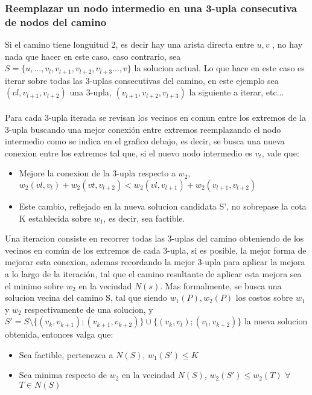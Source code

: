 \subsubsection{Reemplazar un nodo intermedio en una 3-upla consecutiva de nodos del camino}
Si el camino tiene longuitud 2, es decir hay una arista directa entre $u,v$ , no hay nada que hacer en este caso, caso contrario, sea $S = \{u,...,v_l, v_{l+1}, v_{l+2}, v_{l+3} ..., v\}$ la solucion actual. Lo que hace en este caso es iterar sobre todas las 3-uplas consecutivas del camino, en este ejemplo sea $(vl, v_{l+1}, v_{l+2})$ una 3-upla, $(v_{l+1}, v_{l+2}, v_{l+3})$ la siguiente a iterar, etc...\\ \\
Para cada 3-upla iterada se revisan los vecinos en comun entre los extremos de la 3-upla buscando una mejor conexi\'on entre extremos reemplazando el nodo intermedio 
como se indica en el grafico debajo, es decir, se busca una nueva conexion entre los extremos tal que, si el nuevo nodo intermedio es $v_t$, vale que:
\begin{itemize}
	\item Mejore la conexion de la 3-upla respecto a $w_2$, $w_2(vl, v_{t}) + w_2(vt, v_{l+2}) < w_2(vl, v_{l+1}) + w_2(v_{l+1}, v_{l+2})$
	\item Este cambio, reflejado en la nueva solucion candidata S', no sobrepase la cota K establecida sobre $w_1$, es decir, sea factible.
\end{itemize}


Una iteracion consiste en recorrer todas las 3-uplas del camino obteniendo de los vecinos en com\'un de los extremos de cada 3-upla, si es posible, la mejor forma de mejorar esta conexion, ademas recordando la mejor 3-upla para aplicar la mejora a lo largo de la iteraci\'on, tal que el camino resultante de aplicar esta mejora sea el minimo sobre $w_2$ en la vecindad $N(s)$. Mas formalmente, se busca una solucion vecina del camino S, tal que siendo $w_1(P), w_2(P)$ los costos sobre $w_1$ y $w_2$ respectivamente de una solucion, y $S' = S \setminus \{(v_k, v_{k+1}); (v_{k+1}, v_{k+2})\} \cup \{(v_k, v_t);(v_t, v_{k+2})\}$ la nueva solucion obtenida, entonces valga que:
\begin{itemize}
	\item Sea factible, pertenezca a $N(S)$, $ w_1(S') \leq K$
	\item Sea minima respecto de $w_2$ en la vecindad $N(S)$, $w_2(S') \leq w_2(T)$ $ \forall$ $ T \in N(S) $
\end{itemize}

